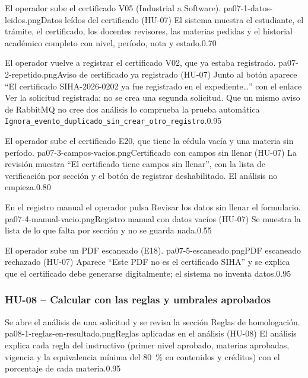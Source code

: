 {El operador sube el certificado V05 (Industrial a Software).}
{pa07-1-datos-leidos.png}{Datos leídos del certificado (HU-07)}
{El sistema muestra el estudiante, el trámite, el certificado, los docentes revisores, las materias pedidas y el
historial académico completo con nivel, período, nota y estado.}{0.70}

{El operador vuelve a registrar el certificado V02, que ya estaba registrado.}
{pa07-2-repetido.png}{Aviso de certificado ya registrado (HU-07)}
{Junto al botón aparece ``El certificado SIHA-2026-0202 ya fue registrado en el expediente…'' con el enlace Ver la
solicitud registrada; no se crea una segunda solicitud. Que un mismo aviso de RabbitMQ no cree dos análisis lo
comprueba la prueba automática \texttt{Ignora\_evento\_duplicado\_sin\_crear\_otro\_registro}.}{0.95}

{El operador sube el certificado E20, que tiene la cédula vacía y una materia sin período.}
{pa07-3-campos-vacios.png}{Certificado con campos sin llenar (HU-07)}
{La revisión muestra ``El certificado tiene campos sin llenar'', con la lista de verificación por sección y el botón
de registrar deshabilitado. El análisis no empieza.}{0.80}

{En el registro manual el operador pulsa Revisar los datos sin llenar el formulario.}
{pa07-4-manual-vacio.png}{Registro manual con datos vacíos (HU-07)}
{Se muestra la lista de lo que falta por sección y no se guarda nada.}{0.55}

{El operador sube un PDF escaneado (E18).}
{pa07-5-escaneado.png}{PDF escaneado rechazado (HU-07)}
{Aparece ``Este PDF no es el certificado SIHA'' y se explica que el certificado debe generarse digitalmente; el
sistema no inventa datos.}{0.95}

\subsubsection{HU-08 -- Calcular con las reglas y umbrales aprobados}

{Se abre el análisis de una solicitud y se revisa la sección Reglas de homologación.}
{pa08-1-reglas-en-resultado.png}{Reglas aplicadas en el análisis (HU-08)}
{El análisis explica cada regla del instructivo (primer nivel aprobado, materias aprobadas, vigencia y la equivalencia
mínima del 80~\% en contenidos y créditos) con el porcentaje de cada materia.}{0.95}

